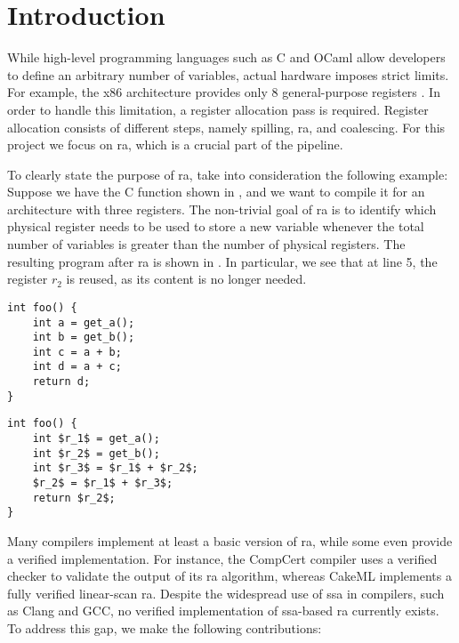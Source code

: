 
\chapter{Introduction}
\label{cha:intro}

While high-level programming languages such as C and OCaml allow developers to define an arbitrary number of variables, actual hardware imposes strict limits. For example, the x86 architecture provides only 8 general-purpose registers \cite{intel_sdm_vol1}.
In order to handle this limitation, a register allocation pass is required. Register allocation consists of different steps, namely spilling, \gls{ra}, and coalescing. For this project we focus on \gls{ra}, which is a crucial part of the pipeline.

To clearly state the purpose of \gls{ra}, take into consideration the following example: Suppose we have the C function shown in , and we want to compile it for an architecture with three registers. The non-trivial goal of \gls{ra} is to identify which physical register needs to be used to store a new variable whenever the total number of variables is greater than the number of physical registers. The resulting program after \gls{ra} is shown in . In particular, we see that at line 5, the register $r_2$ is reused, as its content is no longer needed.

\begin{minipage}{0.48\linewidth}
\centering
\lstset{style=C}
\begin{lstlisting}[caption={C program returning $2a+b$.}, label={fig:cbefore}]
int foo() {
    int a = get_a();
    int b = get_b();
    int c = a + b;
    int d = a + c;
    return d;
}
\end{lstlisting}
\end{minipage}
\hfill
\begin{minipage}{0.48\linewidth}
\centering
\lstset{style=C}
\begin{lstlisting}[caption={Same C program after \gls{ra}.}, label={fig:cafter}]
int foo() {
    int $r_1$ = get_a();
    int $r_2$ = get_b();
    int $r_3$ = $r_1$ + $r_2$;
    $r_2$ = $r_1$ + $r_3$;
    return $r_2$;
}
\end{lstlisting}
\end{minipage}

Many compilers implement at least a basic version of \gls{ra}, while some even provide a verified implementation. For instance, the CompCert \cite{Rideau-Leroy-regalloc} compiler uses a verified checker to validate the output of its \gls{ra} algorithm, whereas CakeML \cite{10.1145/2578855.2535841} implements a fully verified linear-scan \gls{ra}. Despite the widespread use of \gls{ssa} in compilers, such as Clang and GCC, no verified implementation of \gls{ssa}-based \gls{ra} currently exists. To address this gap, we make the following contributions:

